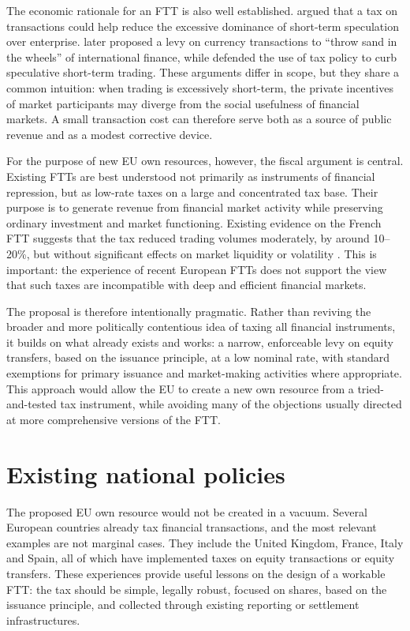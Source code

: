 \documentclass[../main]{subfiles}
\begin{document}
The economic rationale for an FTT is also well established. \citet{Keynes1936} argued that a tax on transactions could help reduce the excessive dominance of short-term speculation over enterprise. \citet{Tobin1978} later proposed a levy on currency transactions to ``throw sand in the wheels'' of international finance, while \citet{Stiglitz1989} defended the use of tax policy to curb speculative short-term trading. These arguments differ in scope, but they share a common intuition: when trading is excessively short-term, the private incentives of market participants may diverge from the social usefulness of financial markets. A small transaction cost can therefore serve both as a source of public revenue and as a modest corrective device.

For the purpose of new EU own resources, however, the fiscal argument is central. Existing FTTs are best understood not primarily as instruments of financial repression, but as low-rate taxes on a large and concentrated tax base. Their purpose is to generate revenue from financial market activity while preserving ordinary investment and market functioning. Existing evidence on the French FTT suggests that the tax reduced trading volumes moderately, by around 10--20\%, but without significant effects on market liquidity or volatility \citep{ColliardHoffmann2017}. This is important: the experience of recent European FTTs does not support the view that such taxes are incompatible with deep and efficient financial markets.

The proposal is therefore intentionally pragmatic. Rather than reviving the broader and more politically contentious idea of taxing all financial instruments, it builds on what already exists and works: a narrow, enforceable levy on equity transfers, based on the issuance principle, at a low nominal rate, with standard exemptions for primary issuance and market-making activities where appropriate. This approach would allow the EU to create a new own resource from a tried-and-tested tax instrument, while avoiding many of the objections usually directed at more comprehensive versions of the FTT.

\section{Existing national policies}

The proposed EU own resource would not be created in a vacuum. Several European countries already tax financial transactions, and the most relevant examples are not marginal cases. They include the United Kingdom, France, Italy and Spain, all of which have implemented taxes on equity transactions or equity transfers. These experiences provide useful lessons on the design of a workable FTT: the tax should be simple, legally robust, focused on shares, based on the issuance principle, and collected through existing reporting or settlement infrastructures.
\end{document}
